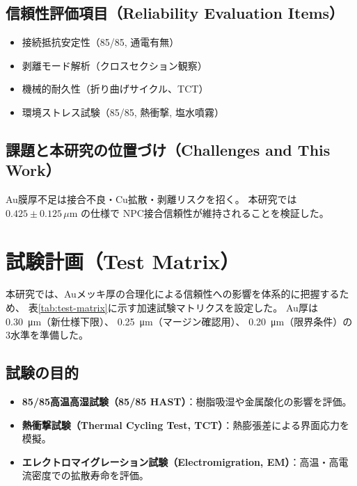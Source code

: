 \documentclass[onecolumn]{IEEEtran} %
\begin{document}
\subsection*{信頼性評価項目（Reliability Evaluation Items）}
\begin{itemize}
  \item 接続抵抗安定性（85/85, 通電有無）
  \item 剥離モード解析（クロスセクション観察）
  \item 機械的耐久性（折り曲げサイクル、TCT）
  \item 環境ストレス試験（85/85, 熱衝撃, 塩水噴霧）
\end{itemize}

\subsection*{課題と本研究の位置づけ（Challenges and This Work）}
Au膜厚不足は接合不良・Cu拡散・剥離リスクを招く。
本研究では $0.425 \pm 0.125\,\mu$m の仕様で
NPC接合信頼性が維持されることを検証した。

\section{試験計画（Test Matrix）}

本研究では、Auメッキ厚の合理化による信頼性への影響を体系的に把握するため、
表\ref{tab:test-matrix}に示す加速試験マトリクスを設定した。
Au厚は \SI{0.30}{\micro\meter}（新仕様下限）、
\SI{0.25}{\micro\meter}（マージン確認用）、
\SI{0.20}{\micro\meter}（限界条件）の3水準を準備した。

\subsection*{試験の目的}
\begin{itemize}
  \item \textbf{85/85高温高湿試験（85/85 HAST）}：樹脂吸湿や金属酸化の影響を評価。
  \item \textbf{熱衝撃試験（Thermal Cycling Test, TCT）}：熱膨張差による界面応力を模擬。
  \item \textbf{エレクトロマイグレーション試験（Electromigration, EM）}：高温・高電流密度での拡散寿命を評価。
\end{itemize}
\end{document}
